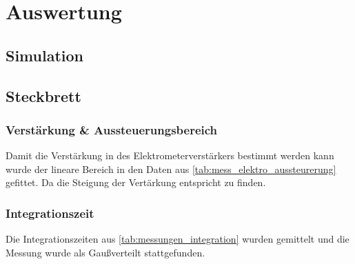 \documentclass[12pt,english,ngerman]{scrartcl}
\begin{document}
\section{Auswertung}\label{sec:Auswertung}

\subsection{Simulation}

\subsection{Steckbrett}

\subsubsection{Verstärkung \& Aussteuerungsbereich}
Damit die Verstärkung in des Elektrometerverstärkers bestimmt werden kann wurde
der lineare Bereich in den Daten aus \autoref{tab:mess_elektro_aussteurerung}
gefittet. Da die Steigung der Vertärkung entspricht zu finden.
\subsubsection{Integrationszeit}
Die Integrationszeiten aus \autoref{tab:messungen_integration} wurden gemittelt
und die Messung wurde als Gaußverteilt stattgefunden.

\end{document}
